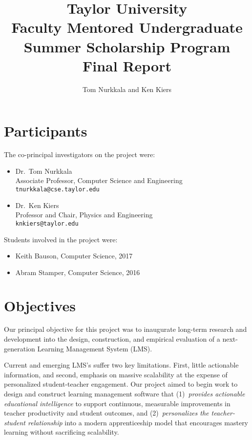\documentclass{article}
\title{Taylor University\\
  Faculty Mentored Undergraduate\\
  Summer Scholarship Program\\
  Final Report}
\author{Tom Nurkkala and Ken Kiers}
\begin{document}
\maketitle


\section{Participants}
\label{sec:participants}

The co-principal investigators on the project were:
\begin{itemize}
\item Dr.\ Tom Nurkkala\\
  Associate Professor, Computer Science and Engineering\\
  \texttt{tnurkkala@cse.taylor.edu}
\item Dr.\ Ken Kiers\\
  Professor and Chair, Physics and Engineering\\
  \texttt{knkiers@taylor.edu}
\end{itemize}
Students involved in the project were:
\begin{itemize}
\item Keith Bauson, Computer Science, 2017
\item Abram Stamper, Computer Science, 2016
\end{itemize}

\section{Objectives}
\label{sec:objectives}

Our principal objective for this project was
to inaugurate long-term research and development
into the design, construction, and empirical evaluation
of a next-generation Learning Management System (LMS).

Current and emerging LMS's
suffer two key limitations.
First, little actionable information,
and second, emphasis on massive scalability
at the expense of
personalized student-teacher engagement.
Our project aimed to begin work to
design and construct
learning management software
that
(1)~\emph{provides actionable educational intelligence}
to support continuous, measurable improvements
in teacher productivity and student outcomes, and
(2)~\emph{personalizes the  teacher-student relationship}
into a modern apprenticeship model that
encourages mastery learning without sacrificing scalability.
\end{document}
